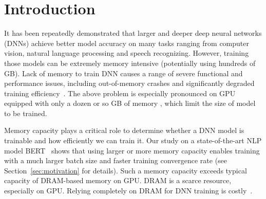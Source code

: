 \section{Introduction}

\textcolor{jie}{It has been repeatedly demonstrated that larger and deeper deep neural networks (DNNs) achieve better model accuracy on many tasks ranging from computer vision, natural language processing and speech recognizing. However, training those models can be extremely memory intensive (potentially using hundreds of GB). }
Lack of memory to train DNN causes a range of severe functional and performance issues, including out-of-memory crashes and significantly degraded training efficiency~\cite{Wang:2018:SDG:3178487.3178491,Rhu:2016:VVD:3195638.3195660}. The above problem is especially pronounced on GPU equipped with only a dozen or so GB of memory%
\textcolor{dong2}{, which limit the size of model to be trained. }

\textcolor{dong}{ 
Memory capacity plays a critical role to determine whether a DNN model is trainable and how efficiently we can train it. Our study on a state-of-the-art NLP model BERT~\cite{devlin2018bert} shows that using %
larger or more memory capacity enables training with %
a much larger batch size and faster training convergence rate (see Section~\ref{sec:motivation} for details). Such a memory capacity exceeds typical capacity of DRAM-based memory on GPU. DRAM is a scarce resource, especially on GPU. Relying completely on DRAM for  DNN training is costly~\cite{ram_price,ram_price2}.}





